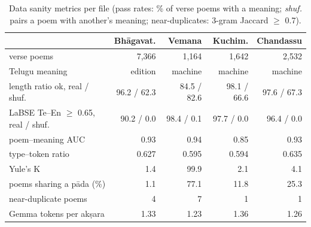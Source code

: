 \documentclass[11pt]{article}
\begin{document}
\begin{table}[H]
\centering\tiny\setlength{\tabcolsep}{3pt}
\begin{tabular}{@{}lrrrr@{}}
\toprule
 & Bhāgavat. & Vemana & Kuchim. & Chandassu \\
\midrule
verse poems & 7,366 & 1,164 & 1,642 & 2,532 \\
Telugu meaning & edition & machine & machine & machine \\
length ratio ok, real / shuf. & 96.2 / 62.3 & 84.5 / 82.6 & 98.1 / 66.6 & 97.6 / 67.3 \\
LaBSE Te--En $\geq$ 0.65, real / shuf. & 90.2 / 0.0 & 98.4 / 0.1 & 97.7 / 0.0 & 96.4 / 0.0 \\
poem--meaning AUC & 0.93 & 0.94 & 0.85 & 0.93 \\
type--token ratio & 0.627 & 0.595 & 0.594 & 0.635 \\
Yule's K & 1.4 & 99.9 & 2.1 & 4.1 \\
poems sharing a pāda (\%) & 1.1 & 77.1 & 11.8 & 25.3 \\
near-duplicate poems & 4 & 7 & 1 & 1 \\
Gemma tokens per akṣara & 1.33 & 1.23 & 1.36 & 1.26 \\
\bottomrule
\end{tabular}
\caption{Data sanity metrics per file (pass rates: \% of verse poems with a meaning; \emph{shuf.} pairs a poem
with another's meaning;
near-duplicates: 3-gram Jaccard $\geq$ 0.7).}
\label{tab:sanity}
\end{table}
\end{document}

